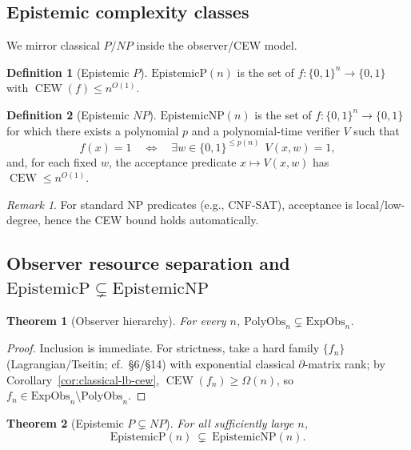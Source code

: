 \documentclass[12pt]{article}
\newtheorem{theorem}{Theorem}
\theoremstyle{definition}
\newtheorem{definition}{Definition}
\theoremstyle{definition}
\theoremstyle{remark}
\newtheorem{remark}{Remark}
\theoremstyle{remark}
\begin{document}
\subsection{Epistemic complexity classes}

We mirror classical $P/NP$ inside the observer/CEW model.

\begin{definition}[Epistemic $P$]\label{def:epistemic-p}
$\mathrm{EpistemicP}(n)$ is the set of $f:\{0,1\}^n\to\{0,1\}$ with $\operatorname{CEW}(f)\le n^{O(1)}$.
\end{definition}

\begin{definition}[Epistemic $NP$]\label{def:epistemic-np}
$\mathrm{EpistemicNP}(n)$ is the set of $f:\{0,1\}^n\to\{0,1\}$ for which there exists a polynomial $p$ and a polynomial-time verifier $V$ such that
\[
f(x)=1 \quad\Longleftrightarrow\quad \exists w\in\{0,1\}^{\le p(n)}\ \ V(x,w)=1,
\]
and, for each fixed $w$, the acceptance predicate $x\mapsto V(x,w)$ has $\operatorname{CEW}\le n^{O(1)}$.
\end{definition}

\begin{remark}
For standard NP predicates (e.g., CNF-SAT), acceptance is local/low-degree, hence the CEW bound holds automatically.
\end{remark}

\subsection{Observer resource separation and $\mathrm{EpistemicP}\subsetneq\mathrm{EpistemicNP}$}

\begin{theorem}[Observer hierarchy]\label{thm:observer-hierarchy}
For every $n$, $\mathrm{PolyObs}_n \subsetneq \mathrm{ExpObs}_n$.
\end{theorem}

\begin{proof}
Inclusion is immediate. For strictness, take a hard family $\{f_n\}$ (Lagrangian/Tseitin; cf.\ \S6/\S14) with exponential classical $\partial$-matrix rank; by Corollary~\ref{cor:classical-lb-cew}, $\operatorname{CEW}(f_n)\ge\Omega(n)$, so $f_n\in\mathrm{ExpObs}_n\setminus\mathrm{PolyObs}_n$.
\end{proof}

\begin{theorem}[Epistemic $P\subsetneq NP$]\label{thm:epistemic-separation}
For all sufficiently large $n$,
\[
\mathrm{EpistemicP}(n) \ \subsetneq\ \mathrm{EpistemicNP}(n).
\]
\end{theorem}
\end{document}
